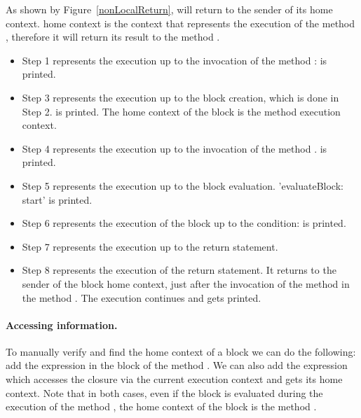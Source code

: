 \documentclass[a4paper,10pt,twoside]{book}
\begin{document}
As shown by Figure~\ref{nonLocalReturn}, \ct{[^33]} will return to the sender of its home context. \ct{[^33]} home context is the context that represents the execution of the method , therefore it will return its result to the method .

\begin{itemize}
\item Step 1 represents the execution up to the invocation of the
  method :  is printed.

\item Step 3 represents the execution up to the block creation, which
  is done in Step 2.  is printed. The home context
  of the block is the  method execution context.

\item Step 4 represents the execution up to the invocation of the method
  .  is printed.

\item Step 5 represents the execution up to the block evaluation.
  'evaluateBlock: start' is printed.

\item Step 6 represents the execution of the block up to the
  condition:  is printed.

\item Step 7 represents the execution up to the return statement.

\item Step 8 represents the execution of the return statement. It
  returns to the sender of the block home context, \ie just after the
  invocation of the method  in the method . The
  execution continues and  gets printed.
\end{itemize}

\paragraph{Accessing information.} 

To manually verify and find the home context of a block we can do the following: add the expression  in the block of the  method . We can also add the expression  which accesses the closure via the current execution context and gets its home context. Note that in both cases, even if the block is evaluated during the execution of the method , the home context of the block is the method .
\end{document}
